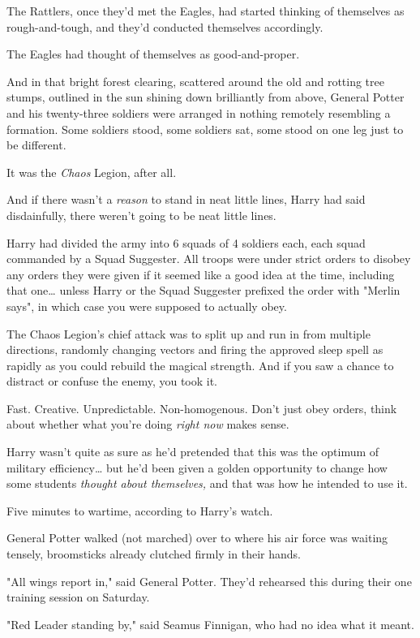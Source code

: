 The Rattlers, once they'd met the Eagles, had started thinking of themselves as 
rough-and-tough, and they'd conducted themselves accordingly.

The Eagles had thought of themselves as good-and-proper.

And in that bright forest clearing, scattered around the old and rotting tree 
stumps, outlined in the sun shining down brilliantly from above, General Potter 
and his twenty-three soldiers were arranged in nothing remotely resembling a 
formation. Some soldiers stood, some soldiers sat, some stood on one leg just 
to be different.

It was the \emph{Chaos} Legion, after all.

And if there wasn't a \emph{reason} to stand in neat little lines, Harry had 
said disdainfully, there weren't going to be neat little lines.

Harry had divided the army into 6 squads of 4 soldiers each, each squad 
commanded by a Squad Suggester. All troops were under strict orders to disobey 
any orders they were given if it seemed like a good idea at the time, including 
that one{\ldots} unless Harry or the Squad Suggester prefixed the order with 
"Merlin says", in which case you were supposed to actually obey.

The Chaos Legion's chief attack was to split up and run in from multiple 
directions, randomly changing vectors and firing the approved sleep spell as 
rapidly as you could rebuild the magical strength. And if you saw a chance to 
distract or confuse the enemy, you took it.

Fast. Creative. Unpredictable. Non-homogenous. Don't just obey orders, think 
about whether what you're doing \emph{right now} makes sense.

Harry wasn't quite as sure as he'd pretended that this was the optimum of 
military efficiency{\ldots} but he'd been given a golden opportunity to change 
how some students \emph{thought about themselves,} and that was how he intended 
to use it.

Five minutes to wartime, according to Harry's watch.

General Potter walked (not marched) over to where his air force was waiting 
tensely, broomsticks already clutched firmly in their hands.

"All wings report in," said General Potter. They'd rehearsed this during their 
one training session on Saturday.

"Red Leader standing by," said Seamus Finnigan, who had no idea what it meant.


